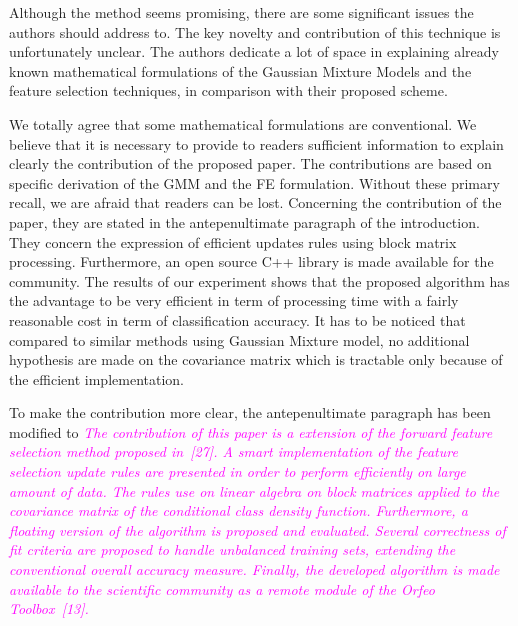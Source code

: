 \documentclass[a4paper,10pt,DIV=16]{scrartcl}
\newcommand{\rev}[1]{\textcolor{magenta}{#1}}
\begin{document}
\begin{revbox}
  Although the method seems promising, there are some significant issues the authors should address to. The key novelty and contribution of this technique is unfortunately unclear. The authors dedicate a lot of space in explaining already known mathematical formulations of the Gaussian Mixture Models and the feature selection techniques, in comparison with their proposed scheme.
  \begin{resbox}
    We totally agree that some mathematical formulations are conventional. We believe that it is necessary to provide to readers sufficient information to explain clearly the contribution of the proposed paper. The contributions are based on specific derivation of the GMM and the FE formulation. Without these primary recall, we are afraid that readers can be lost. Concerning the contribution of the paper, they are stated in the antepenultimate paragraph of the introduction. They concern the expression of efficient updates rules using block matrix processing. Furthermore, an open source C++ library is made available for the community. The results of our experiment shows that the proposed algorithm has the advantage to be very efficient in term of processing time with a fairly reasonable cost in term of classification accuracy. It has to be noticed that compared to similar methods using Gaussian Mixture model, no additional hypothesis are made on the covariance matrix which is tractable only because of the efficient implementation.

    To make the contribution more clear, the antepenultimate paragraph has been modified to
\emph{\rev{The contribution of this paper is a extension of the forward feature selection method proposed in~[27]. A smart implementation of the feature selection update rules are presented in order to perform efficiently on large amount of data. The rules use on linear algebra on block matrices applied to the covariance matrix of the conditional class density function.  Furthermore, a floating version of the algorithm is proposed and evaluated. Several \emph{correctness of fit} criteria are proposed to handle unbalanced training sets, extending the conventional \emph{overall accuracy} measure.  Finally, the developed algorithm is made available to the scientific community as a remote module of the Orfeo Toolbox~[13].}}
  \end{resbox}
\end{revbox}
\end{document}
